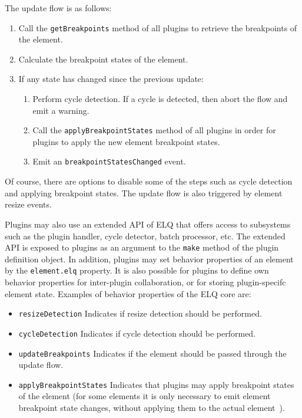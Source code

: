 \documentclass[]{llncs}
\newcommand{\code}[1]{\texttt{#1}}
\newcommand{\elq}{ELQ}
\begin{document}
  \noindent
  The update flow is as follows:
  \begin{enumerate}
    \item Call the \code{getBreakpoints} method of all plugins to retrieve the breakpoints of the element.
    \item Calculate the breakpoint states of the element.
    \item If any state has changed since the previous update:
    \begin{enumerate}
      \item Perform cycle detection. If a cycle is detected, then abort the flow and emit a warning.
      \item Call the \code{applyBreakpointStates} method of all plugins in order for plugins to apply the new element breakpoint states.
      \item Emit an \code{breakpointStatesChanged} event.
    \end{enumerate}
  \end{enumerate}

  \noindent
  Of course, there are options to disable some of the steps such as cycle detection and applying breakpoint states.
  The update flow is also triggered by element resize events.

  Plugins may also use an extended API of \elq{} that offers access to subsystems such as the plugin handler, cycle detector, batch processor, etc.
  The extended API is exposed to plugins as an argument to the \code{make} method of the plugin definition object.
  In addition, plugins may set behavior properties of an element by the \code{element.elq} property.
  It is also possible for plugins to define own behavior properties for inter-plugin collaboration, or for storing plugin-specifc element state.
  Examples of behavior properties of the \elq{} core are:
  \begin{itemize}
    \item \code{resizeDetection} Indicates if resize detection should be performed.
    \item \code{cycleDetection} Indicates if cycle detection should be performed.
    \item \code{updateBreakpoints} Indicates if the element should be passed through the update flow.
    \item \code{applyBreakpointStates} Indicates that plugins may apply breakpoint states of the element (for some elements it is only necessary to emit element breakpoint state changes, without applying them to the actual element~\cite{elq-thesis}).
  \end{itemize}
\end{document}
